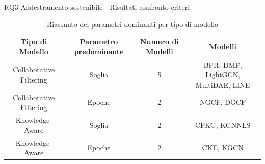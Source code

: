 \begin{frame}{RQ3 Addestramento sostenibile - Risultati confronto criteri}
\begin{table}[H]
    \scriptsize
    \centering
        \begin{tabular}{|c|c|c|c|}
            \hline
            \textbf{Tipo di Modello} & \textbf{Parametro predominante} & \textbf{Numero di Modelli} & \textbf{Modelli} \\ \hline
            Collaborative Filtering & Soglia & 5 & BPR, DMF, LightGCN, MultiDAE, LINE \\ \hline
            Collaborative Filtering & Epoche & 2 & NGCF, DGCF \\ \hline
            Knowledge-Aware & Soglia & 2 & CFKG, KGNNLS \\ \hline
            Knowledge-Aware & Epoche & 2 & CKE, KGCN \\ \hline
        \end{tabular}
    \caption{Riassunto dei parametri dominanti per tipo di modello}
\end{table}

\end{frame}